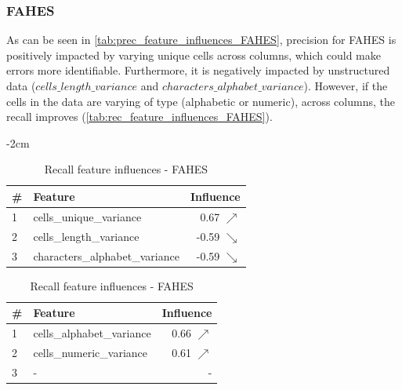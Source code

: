 
\subsubsection{FAHES}
As can be seen in \autoref{tab:prec_feature_influences_FAHES}, precision for FAHES is positively impacted by varying unique cells across columns, which could make errors more identifiable. Furthermore, it is negatively impacted by unstructured data ($cells\_length\_variance$ and $characters\_alphabet\_variance$). However, if the cells in the data are varying of type (alphabetic or numeric), across columns, the recall improves (\autoref{tab:rec_feature_influences_FAHES}).

\begin{table}[H]
	\centering
	\addtolength{\leftskip} {-2cm}
	\addtolength{\rightskip}{-2cm}
	\captionsetup[subtable]{position = below}
	\captionsetup[table]{position=top}
	\caption{Top feature influences - FAHES}
	\label{tab:feature_influences_FAHES}
		\begin{subtable}{0.5\linewidth}
		\centering
		\begin{tabular}{llr}
\toprule
 \# &                         Feature &         Influence \\
\midrule
 1 &         cells\_unique\_variance &   0.67 $\nearrow$ \\
 2 &         cells\_length\_variance &  -0.59 $\searrow$ \\
 3 &  characters\_alphabet\_variance &  -0.59 $\searrow$ \\
\bottomrule
\end{tabular}
		\caption{Precision feature influences - FAHES}
		\label{tab:prec_feature_influences_FAHES}
	\end{subtable}
	\hspace*{4em}
	\begin{subtable}{0.5\linewidth}
		\centering
		\begin{tabular}{llr}
\toprule
 \# &                    Feature &        Influence \\
\midrule
 1 &  cells\_alphabet\_variance &  0.66 $\nearrow$ \\
 2 &   cells\_numeric\_variance &  0.61 $\nearrow$ \\
 3 &      - &                - \\
\bottomrule
\end{tabular}
		\caption{Recall feature influences - FAHES}
		\label{tab:rec_feature_influences_FAHES}
	\end{subtable}%
\end{table}

